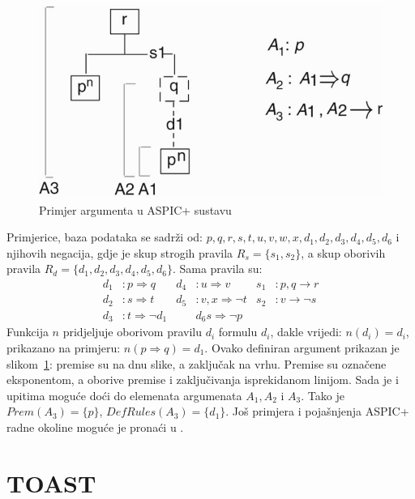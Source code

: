 \begin{figure}
    \includegraphics[scale=0.6]{aspic.jpg}
    \caption{Primjer argumenta u ASPIC+ sustavu}
\label{fig:aspic}
\end{figure}

Primjerice, baza podataka se sadrži od:
$p, q, r, s, t, u, v, w, x, d_1, d_2, d_3, d_4, d_5, d_6$ i njihovih negacija, gdje 
je skup strogih pravila $R_s = \{s_1, s_2\}$, a skup oborivih pravila
$R_d = \{d_1, d_2, d_3, d_4, d_5, d_6\}$. Sama pravila su:
\begin{align*}
    d_1&: p \Rightarrow q  &   d_4&: u \Rightarrow v   &    s_1&: p, q \rightarrow r \\
    d_2&: s \Rightarrow t  &   d_5&: v, x \Rightarrow \neg t  &    s_2&: v \rightarrow \neg s \\
    d_3&: t \Rightarrow \neg d_1  &  & d_6 s \Rightarrow \neg p
\end{align*}
Funkcija $n$ pridjeljuje oborivom pravilu $d_i$ formulu $d_i$, dakle vrijedi:
$n(d_i) = d_i$, prikazano na primjeru: $n(p \Rightarrow q) = d_1$. Ovako definiran argument
prikazan je slikom~\ref{fig:aspic}: premise su na dnu slike, a zaključak na vrhu. Premise
su označene eksponentom, a oborive premise i zaključivanja isprekidanom linijom. 
Sada je i upitima moguće doći do elemenata argumenata $A_1, A_2$ i $A_3$. Tako je
$Prem(A_3) = \{p\}$, $DefRules(A_3) = \{d_1\}$. Još primjera i pojašnjenja ASPIC+
radne okoline moguće je pronaći u \citep{modgil2014aspic+}. 

\section{TOAST}

